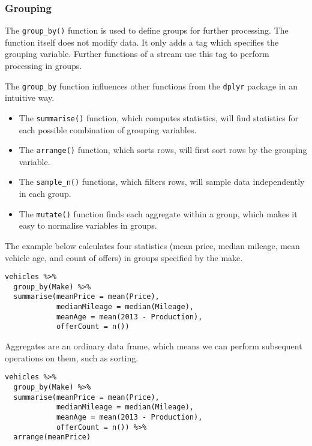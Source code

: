 \documentclass[]{book}
\theoremstyle{definition}
\theoremstyle{definition}
\theoremstyle{definition}
\theoremstyle{remark}
\begin{document}
\subsubsection*{Grouping}\label{grouping}

The \texttt{group\_by()} function is used to define groups for further
processing. The function itself does not modify data. It only adds a tag
which specifies the grouping variable. Further functions of a stream use
this tag to perform processing in groups.

The \texttt{group\_by} function influences other functions from the
\texttt{dplyr} package in an intuitive way.

\begin{itemize}
\item
  The \texttt{summarise()} function, which computes statistics, will
  find statistics for each possible combination of grouping variables.
\item
  The \texttt{arrange()} function, which sorts rows, will first sort
  rows by the grouping variable.
\item
  The \texttt{sample\_n()} functions, which filters rows, will sample
  data independently in each group.
\item
  The \texttt{mutate()} function finds each aggregate within a group,
  which makes it easy to normalise variables in groups.
\end{itemize}

The example below calculates four statistics (mean price, median
mileage, mean vehicle age, and count of offers) in groups specified by
the make.

\begin{verbatim}
vehicles %>%
  group_by(Make) %>%
  summarise(meanPrice = mean(Price),
            medianMileage = median(Mileage),
            meanAge = mean(2013 - Production),
            offerCount = n())
\end{verbatim}

Aggregates are an ordinary data frame, which means we can perform
subsequent operations on them, such as sorting.

\begin{verbatim}
vehicles %>%
  group_by(Make) %>%
  summarise(meanPrice = mean(Price),
            medianMileage = median(Mileage),
            meanAge = mean(2013 - Production),
            offerCount = n()) %>%
  arrange(meanPrice)
\end{verbatim}
\end{document}
